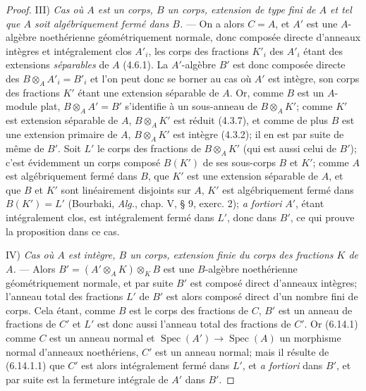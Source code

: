 \begin{proof}
III) \emph{Cas où $A$ est un corps, $B$ un corps, extension de type fini de
$A$ et tel que $A$ soit algébriquement fermé dans $B$.} --- On a alors
$C=A$, et $A'$ est une $A$-algèbre noethérienne géométriquement normale,
donc composée directe d'anneaux intègres et intégralement clos $A'_i$, les
corps des fractions $K'_i$ des $A'_i$ étant des extensions \emph{séparables} de
$A$ (4.6.1). La $A'$-algèbre $B'$ est donc composée directe des
$B\otimes_A A'_i=B'_i$ et l'on peut donc se borner au cas où $A'$ est
intègre, son corps des fractions $K'$ étant une extension séparable de $A$.
Or, comme $B$ est un $A$-module plat, $B\otimes_A A'=B'$ s'identifie à un
sous-anneau de $B\otimes_A K'$; comme $K'$ est extension séparable de $A$,
$B\otimes_A K'$ est réduit (4.3.7), et comme de plus $B$ est une extension
primaire de $A$, $B\otimes_A K'$ est intègre (4.3.2); il en est par suite
de même de $B'$. Soit $L'$ le corps des fractions de $B\otimes_A K'$ (qui
est aussi celui de $B'$); c'est évidemment un corps composé $B(K')$ de ses
sous-corps $B$ et $K'$; comme $A$ est algébriquement fermé dans $B$, que
$K'$ est une extension séparable de $A$, et que $B$ et $K'$ sont
linéairement disjoints sur $A$, $K'$ est algébriquement fermé dans
$B(K')=L'$ (Bourbaki, \emph{Alg.}, chap. V, § 9, exerc. 2); \emph{a fortiori} $A'$, étant
intégralement clos, est intégralement fermé dans $L'$, donc dans $B'$, ce
qui prouve la proposition dans ce cas.

IV) \emph{Cas où $A$ est intègre, $B$ un corps, extension finie du corps
des fractions $K$ de $A$.} --- Alors
$B'=(A'\otimes_A K)\otimes_K B$ est une $B$-algèbre noethérienne
géométriquement normale, et par suite $B'$ est composé direct d'anneaux
intègres; l'anneau total des fractions $L'$ de $B'$ est alors composé
direct d'un nombre fini de corps. Cela étant, comme $B$ est le corps des
fractions de $C$, $B'$ est un anneau de fractions de $C'$ et $L'$ est donc
aussi l'anneau total des fractions de $C'$. Or (6.14.1) comme $C$ est un
anneau normal et $\operatorname{Spec}(A')\to\operatorname{Spec}(A)$ un
morphisme normal d'anneaux noethériens, $C'$ est un anneau normal; mais il
résulte de (6.14.1.1) que $C'$ est alors intégralement fermé dans $L'$, et
\emph{a fortiori} dans $B'$, et par suite est la fermeture intégrale de $A'$ dans
$B'$.


\end{proof}
